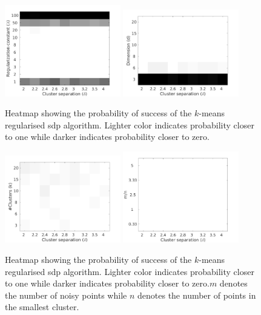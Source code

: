 \documentclass[12pt]{article}
\begin{document}
\begin{figure}[t]
  \label{a-figure:simulation}
  \centering
  \includegraphics[width=0.45\textwidth]{figures/optimizationClustering/deltaLambda.png}
  \includegraphics[width=0.45\textwidth]{figures/optimizationClustering/deltaD.png}
  \caption{Heatmap showing the probability of success of the $k$-means regularised sdp algorithm. Lighter color indicates probability closer to one while darker indicates probability closer to zero.}
\end{figure}
\begin{figure}
  \includegraphics[width=0.45\textwidth]{figures/optimizationClustering/deltaK.png}
  \includegraphics[width=0.45\textwidth]{figures/optimizationClustering/deltaM.png}
  \caption{Heatmap showing the probability of success of the $k$-means regularised sdp algorithm. Lighter color indicates probability closer to one while darker indicates probability closer to zero.$m$ denotes the number of noisy points while $n$ denotes the number of points in the smallest cluster.}
\end{figure}
\end{document}
